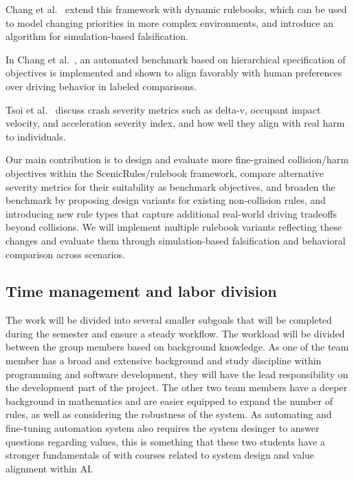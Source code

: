 \documentclass[conference]{IEEEtran}
\begin{document}
Chang et al.~\cite{chang2024dynamicrulebooks} extend this framework with dynamic rulebooks, which can be used to model changing priorities in more complex environments, and introduce an algorithm for simulation-based falsification.

In Chang et al.~\cite{chang2026scenicrules}, an automated benchmark based on hierarchical specification of objectives is implemented and shown to align favorably with human preferences over driving behavior in labeled comparisons.

Tsoi et al.~\cite{tsoi2015crashseverity} discuss crash severity metrics such as delta-v, occupant impact velocity, and acceleration severity index, and how well they align with real harm to individuals.

Our main contribution is to design and evaluate more fine-grained collision/harm objectives within the ScenicRules/rulebook framework, compare alternative severity metrics for their suitability as benchmark objectives, and broaden the benchmark by proposing design variants for existing non-collision rules, and introducing new rule types that capture additional real-world driving tradeoffs beyond collisions. We will implement multiple rulebook variants reflecting these changes and evaluate them through simulation-based falsification and behavioral comparison across scenarios.

\subsection{Time management and labor division}
The work will be divided into several smaller subgoals that will be completed during the semester and ensure a steady workflow. The workload will be divided between the group members based on background knowledge. As one of the team member has a broad and extensive background and study discipline within programming and software development, they will have the lead responsibility on the development part of the project. The other two team members have a deeper background in mathematics and are easier equipped to expand the number of rules, as well as considering the robustness of the system. As automating and fine-tuning automation system also requires the system desinger to answer questions regarding values, this is something that these two students have a stronger fundamentals of with courses related to system design and value alignment within AI.
\end{document}
